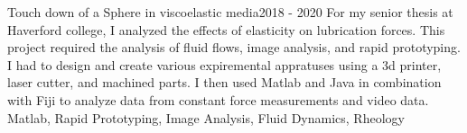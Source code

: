%
%
%


\begin{projects}
	\project
	{Touch down of a Sphere in viscoelastic media}{2018 - 2020}
	{  }
	{For my senior thesis at Haverford college, I analyzed the effects of elasticity on lubrication forces. This project required the analysis of fluid flows, image analysis, and rapid prototyping. I had to design and create various expiremental appratuses using a 3d printer, laser cutter, and machined parts. I then used Matlab and Java in combination with Fiji to analyze data from constant force measurements and video data.}
	{Matlab, Rapid Prototyping, Image Analysis, Fluid Dynamics, Rheology}
				
	
\end{projects}